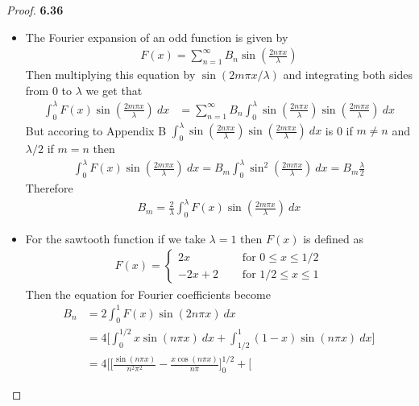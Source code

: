 \documentclass[11pt]{article}
\theoremstyle{definition}
\begin{document}
\cleardoublepage
\begin{proof}{\textbf{6.36}}
\begin{itemize}
    \item [\textbf{(a)}] The Fourier expansion of an odd function is given by
    \begin{align*}
        F(x) = \sum_{n=1}^\infty B_n \sin(\frac{2n\pi x}{\lambda})
    \end{align*}
    Then multiplying this equation by $\sin(2m\pi x/\lambda)$ and integrating
    both sides from $0$ to $\lambda$ we get that
    \begin{align*}
        \int_0^\lambda F(x)\sin(\frac{2m\pi x}{\lambda})~dx
        &= \sum_{n=1}^\infty B_n \int_0^\lambda
        \sin(\frac{2n\pi x}{\lambda})\sin(\frac{2m\pi x}{\lambda})~dx
    \end{align*}
    But accoring to Appendix B
    $\int_0^\lambda \sin(\frac{2n\pi x}{\lambda})\sin(\frac{2m\pi x}{\lambda})~dx$
    is 0 if $m \neq n$ and $\lambda/2$ if $m = n$ then
    \begin{align*}
        \int_0^\lambda F(x)\sin(\frac{2m\pi x}{\lambda})~dx
        = B_m \int_0^\lambda\sin^2\left(\frac{2m\pi x}{\lambda}\right)~dx
        = B_m \frac{\lambda}{2}
    \end{align*}
    Therefore
    \begin{align*}
        B_m = \frac{2}{\lambda}\int_0^\lambda F(x)\sin(\frac{2m\pi x}{\lambda})~dx
    \end{align*}
    \item[\textbf{(b)}] For the sawtooth function if we take $\lambda = 1$
    then $F(x)$ is defined as
    \begin{align*}
        F(x) = \begin{cases}
            2x \quad&\text{ for } 0 \leq x \leq 1/2\\
            -2x + 2 \quad&\text{ for } 1/2 \leq x \leq 1
        \end{cases}
    \end{align*}
    Then the equation for Fourier coefficients become
    \begin{align*}
        B_n &= 2\int_0^1 F(x)\sin(2n\pi x)~dx\\
        &= 4\Bigg[
            \int_0^{1/2} x\sin(n\pi x)~dx + \int_{1/2}^{1} (1-x)\sin(n\pi x)~dx
        \Bigg]\\
        &= 4\Bigg[
            \Bigg[
                \frac{\sin(n\pi x)}{n^2\pi^2}
                - \frac{x\cos(n\pi x)}{n\pi}
            \Bigg]_0^{1/2}
            + \Bigg[

\end{align*}
\end{itemize}
\end{proof}
\end{document}
